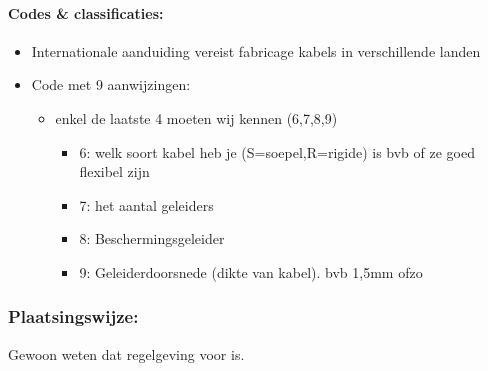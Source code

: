 \documentclass[12pt]{article}
\begin{document}
\paragraph{Codes \& classificaties:}
\begin{itemize}
    \item Internationale aanduiding vereist fabricage kabels in verschillende landen
    \item Code met 9 aanwijzingen:\begin{itemize}
        \item enkel de laatste 4 moeten wij kennen (6,7,8,9)\begin{itemize}
            \item 6: welk soort kabel heb je (S=soepel,R=rigide) is bvb of ze goed flexibel zijn
            \item 7: het aantal geleiders
            \item 8: Beschermingsgeleider
            \item 9: Geleiderdoorsnede (dikte van kabel). bvb 1,5mm ofzo
        \end{itemize}
    \end{itemize}
\end{itemize}
\subsubsection{Plaatsingswijze:}
Gewoon weten dat regelgeving voor is.
\end{document}
